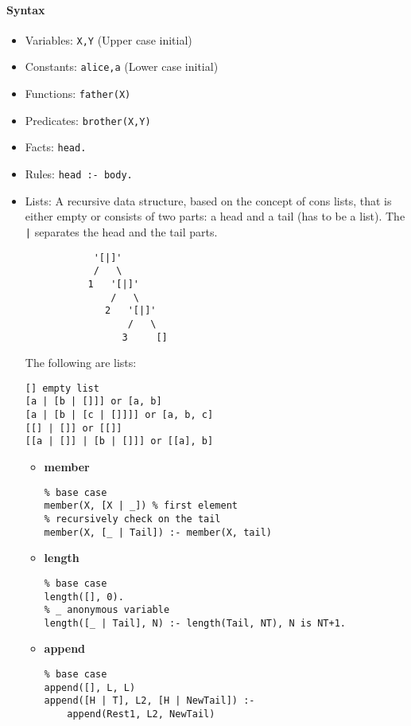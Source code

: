 \documentclass{article}
\begin{document}
\paragraph{Syntax}
\begin{itemize}
    \item Variables: \texttt{X,Y} (Upper case initial)
    \item Constants: \texttt{alice,a} (Lower case initial)
    \item Functions: \texttt{father(X)} 
    \item Predicates: \texttt{brother(X,Y)} 
    \item Facts: \texttt{head.}
    \item Rules: \texttt{head :- body.}
    \item Lists: A recursive data structure, based on the concept of cons
        lists, that is either empty or consists
        of two parts: a head and a tail (has to be a list). The \texttt{|}
        separates the head and the tail parts. 
        \begin{verbatim}
            '[|]'
            /   \
           1   '[|]'
               /   \
              2   '[|]'
                  /   \
                 3     []
        \end{verbatim}
        The following are lists:
        \begin{verbatim}
[] empty list
[a | [b | []]] or [a, b]
[a | [b | [c | []]]] or [a, b, c]
[[] | []] or [[]]
[[a | []] | [b | []]] or [[a], b]
        \end{verbatim}
        \begin{itemize}
            \item \textbf{member}
                \begin{verbatim}
% base case
member(X, [X | _]) % first element
% recursively check on the tail
member(X, [_ | Tail]) :- member(X, tail) 
                \end{verbatim}
            \item \textbf{length} 
                \begin{verbatim}
% base case
length([], 0).
% _ anonymous variable
length([_ | Tail], N) :- length(Tail, NT), N is NT+1.
                \end{verbatim}
            \item \textbf{append} 
                \begin{verbatim}
% base case
append([], L, L) 
append([H | T], L2, [H | NewTail]) :- 
    append(Rest1, L2, NewTail)
                \end{verbatim}

\end{itemize}
\end{itemize}
\end{document}

